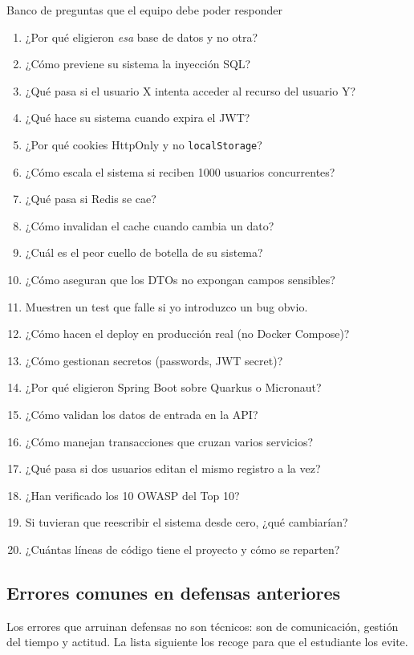 \documentclass[11pt,a4paper,openany]{book}
\begin{document}
\begin{cajabuenas}{Banco de preguntas que el equipo debe poder responder}
\begin{enumerate}
\item ¿Por qué eligieron \emph{esa} base de datos y no otra?
\item ¿Cómo previene su sistema la inyección SQL?
\item ¿Qué pasa si el usuario X intenta acceder al recurso del
usuario Y?
\item ¿Qué hace su sistema cuando expira el JWT?
\item ¿Por qué cookies HttpOnly y no \texttt{localStorage}?
\item ¿Cómo escala el sistema si reciben 1000 usuarios concurrentes?
\item ¿Qué pasa si Redis se cae?
\item ¿Cómo invalidan el cache cuando cambia un dato?
\item ¿Cuál es el peor cuello de botella de su sistema?
\item ¿Cómo aseguran que los DTOs no expongan campos sensibles?
\item Muestren un test que falle si yo introduzco un bug obvio.
\item ¿Cómo hacen el deploy en producción real (no Docker Compose)?
\item ¿Cómo gestionan secretos (passwords, JWT secret)?
\item ¿Por qué eligieron Spring Boot sobre Quarkus o Micronaut?
\item ¿Cómo validan los datos de entrada en la API?
\item ¿Cómo manejan transacciones que cruzan varios servicios?
\item ¿Qué pasa si dos usuarios editan el mismo registro a la vez?
\item ¿Han verificado los 10 OWASP del Top 10?
\item Si tuvieran que reescribir el sistema desde cero, ¿qué
cambiarían?
\item ¿Cuántas líneas de código tiene el proyecto y cómo se reparten?
\end{enumerate}
\end{cajabuenas}

\subsection{Errores comunes en defensas anteriores}

Los errores que arruinan defensas no son técnicos: son de
comunicación, gestión del tiempo y actitud. La lista siguiente los
recoge para que el estudiante los evite.
\end{document}
